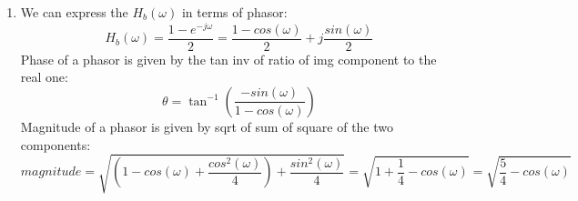 \documentclass{article}
\begin{document}
\begin{enumerate}
\begin{enumerate}
\begin{enumerate}
\item 
                We can express the $H_b(\omega)$ in terms of phasor:
                \[
                    H_b(\omega) = \frac{1 - e^{-j\omega}}{2} = \frac{1 - cos(\omega)}{2} + j \frac{sin(\omega)}{2}
                \]
                Phase of a phasor is given by the tan inv of ratio of img component to the real one:
                \[
                    \theta = \tan^{-1} \left( \frac{-sin(\omega)}{1 - cos(\omega)} \right)
                \]
                Magnitude of a phasor is given by sqrt of sum of square of the two components:
                \[
                    magnitude = \sqrt{\left( 1 - cos(\omega) + \frac{cos^2(\omega)}{4} \right) + \frac{sin^2(\omega)}{4}} = \sqrt{1 + \frac{1}{4} - cos(\omega)} = \sqrt{\frac{5}{4} - cos(\omega)}
                \]


\end{enumerate}
\end{enumerate}
\end{enumerate}
\end{document}
